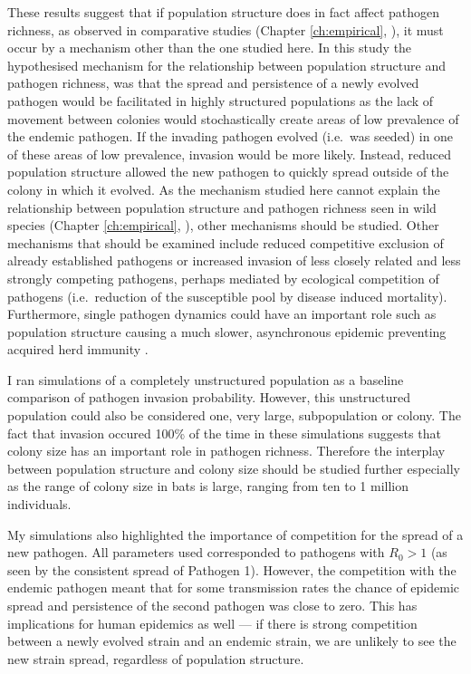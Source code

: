These results suggest that if population structure does in fact affect pathogen richness, as observed in comparative studies (Chapter \ref{ch:empirical}, \cites{vitone2004body, maganga2014bat, turmelle2009correlates}), it must occur by a mechanism other than the one studied here.
In this study the hypothesised mechanism for the relationship between population structure and pathogen richness, was that the spread and persistence of a newly evolved pathogen would be facilitated in highly structured populations as the lack of movement between colonies would stochastically create areas of low prevalence of the endemic pathogen.
If the invading pathogen evolved (i.e.\ was seeded) in one of these areas of low prevalence, invasion would be more likely.
Instead, reduced population structure allowed the new pathogen to quickly spread outside of the colony in which it evolved.
As the mechanism studied here cannot explain the relationship between population structure and pathogen richness seen in wild species (Chapter \ref{ch:empirical}, \cites{vitone2004body, maganga2014bat, turmelle2009correlates}), other mechanisms should be studied.
Other mechanisms that should be examined include reduced competitive exclusion of already established pathogens or increased invasion of less closely related and less strongly competing pathogens, perhaps mediated by ecological competition of pathogens (i.e.\ reduction of the susceptible pool by disease induced mortality).
Furthermore, single pathogen dynamics could have an important role such as population structure causing a much slower, asynchronous epidemic preventing acquired herd immunity \cite{plowright2011urban}.

I ran simulations of a completely unstructured population as a baseline comparison of pathogen invasion probability.
However, this unstructured population could also be considered one, very large, subpopulation or colony.
The fact that invasion occured 100\% of the time in these simulations suggests that colony size has an important role in pathogen richness.
Therefore the interplay between population structure and colony size should be studied further especially as the range of colony size in bats is large, ranging from ten to 1 million \cite{jones2009pantheria} individuals.

My simulations also highlighted the importance of competition for the spread of a new pathogen.
All parameters used corresponded to pathogens with $R_0>1$ (as seen by the consistent spread of Pathogen 1).
However, the competition with the endemic pathogen meant that for some transmission rates the chance of epidemic spread and persistence of the second pathogen was close to zero.
This has implications for human epidemics as well --- if there is strong competition between a newly evolved strain and an endemic strain, we are unlikely to see the new strain spread, regardless of population structure.



